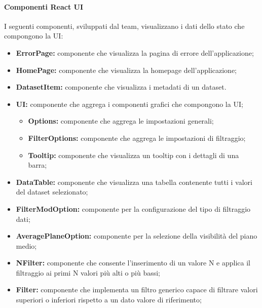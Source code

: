 \paragraph{Componenti React UI}
    I seguenti componenti, sviluppati dal team, visualizzano i dati dello stato che compongono la UI:
    \begin{itemize}
        \item \textbf{ErrorPage:} componente che visualizza la pagina di errore dell'applicazione;
        \item \textbf{HomePage:} componente che visualizza la homepage dell'applicazione;
        \item \textbf{DatasetItem:} componente che visualizza i metadati di un dataset.
        \item \textbf{UI:} componente che aggrega i componenti grafici che compongono la UI;
            \begin{itemize}
                \item \textbf{Options:} componente che aggrega le impostazioni generali;
                \item \textbf{FilterOptions:} componente che aggrega le impostazioni di filtraggio;
                \item \textbf{Tooltip:} componente che visualizza un tooltip con i dettagli di una barra;
            \end{itemize}
        \item \textbf{DataTable:} componente che visualizza una tabella contenente tutti i valori del dataset selezionato;
        \item \textbf{FilterModOption:} componente per la configurazione del tipo di filtraggio dati;
        \item \textbf{AveragePlaneOption:} componente per la selezione della visibilità del piano medio;
        \item \textbf{NFilter:} componente che consente l'inserimento di un valore N e applica il filtraggio ai primi N valori più alti o più bassi;
        \item \textbf{Filter:} componente che implementa un filtro generico capace di filtrare valori superiori o inferiori rispetto a un dato valore di riferimento;
    \end{itemize}
